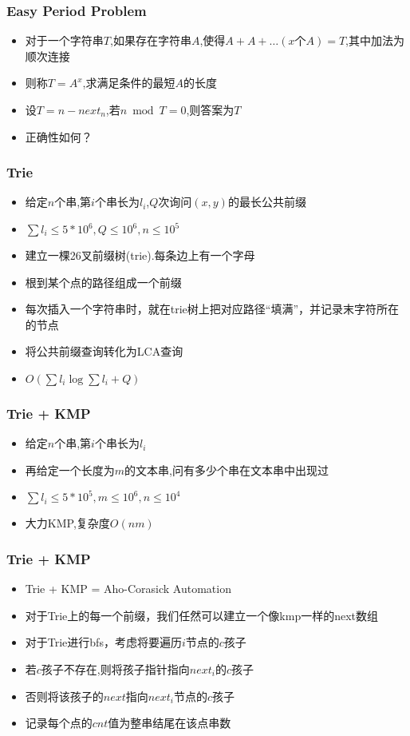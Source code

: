 \documentclass[notheorems]{beamer}
\begin{document}
\begin{frame}
\frametitle{Easy Period Problem}
\begin{itemize}[]
\item 对于一个字符串$T$,如果存在字符串$A$,使得$A+A+\ldots (x个A)= T$,其中加法为顺次连接
\item 则称$T=A^x$,求满足条件的最短$A$的长度
\pause
\item 设$T=n-next_n$,若$n \bmod T = 0$,则答案为$T$
\item 正确性如何？
\end{itemize}
\end{frame}

\begin{frame}
\frametitle{Trie}
\begin{itemize}[]
\item 给定$n$个串,第$i$个串长为$l_i$,$Q$次询问$(x,y)$的最长公共前缀
\item $\sum l_i \leq 5*10^6,Q\leq 10^6,n\leq 10^5$
\pause
\item 建立一棵26叉前缀树(trie).每条边上有一个字母
\item 根到某个点的路径组成一个前缀
\item 每次插入一个字符串时，就在trie树上把对应路径“填满”，并记录末字符所在的节点
\pause
\item 将公共前缀查询转化为LCA查询
\item $O(\sum {l_i}\log \sum{l_i} + Q)$
\end{itemize}
\end{frame}

\begin{frame}
\frametitle{Trie + KMP}
\begin{itemize}[]
\item 给定$n$个串,第$i$个串长为$l_i$
\item 再给定一个长度为$m$的文本串,问有多少个串在文本串中出现过
\item $\sum l_i \leq 5*10^5,m\leq 10^6,n\leq 10^4$
\pause
\item 大力KMP,复杂度$O(nm)$
\end{itemize}
\end{frame}

\begin{frame}
\frametitle{Trie + KMP}
\begin{itemize}[]
\item Trie + KMP = Aho-Corasick Automation
\pause
\item 对于Trie上的每一个前缀，我们任然可以建立一个像kmp一样的next数组
\item 对于Trie进行bfs，考虑将要遍历$i$节点的$c$孩子
\pause
\item 若$c$孩子不存在,则将孩子指针指向$next_i$的$c$孩子
\item 否则将该孩子的$next$指向$next_i$节点的$c$孩子
\pause
\item 记录每个点的$cnt$值为整串结尾在该点串数
\end{itemize}
\end{frame}
\end{document}

